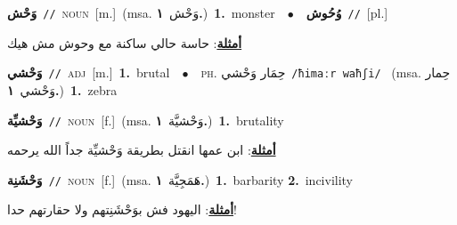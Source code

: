 \documentclass[10pt,a4paper,twoside]{article} %
\begin{document}
\begin{multicols}{2}
{\setlength\topsep{0pt}\textbf{\foreignlanguage{arabic}{وَحْش}}\ {\color{gray}\texttt{//}\color{black}}\ \textsc{noun}\ [m.]\ \color{gray}(msa. \foreignlanguage{arabic}{وَحْش}~\foreignlanguage{arabic}{\textbf{١.}})\color{black}\ \textbf{1.}~monster\ \ $\bullet$\ \ \setlength\topsep{0pt}\textbf{\foreignlanguage{arabic}{وُحُوش}}\ {\color{gray}\texttt{//}\color{black}}\ [pl.]\  \begin{flushright}\color{gray}\foreignlanguage{arabic}{\textbf{\underline{\foreignlanguage{arabic}{أمثلة}}}: حاسة حالي ساكنة مع وحوش مش هيك}\end{flushright}\color{black}} \vspace{2mm}

{\setlength\topsep{0pt}\textbf{\foreignlanguage{arabic}{وَحْشي}}\ {\color{gray}\texttt{//}\color{black}}\ \textsc{adj}\ [m.]\ \textbf{1.}~brutal\ \ $\bullet$\ \ \textsc{ph.} \color{gray} \foreignlanguage{arabic}{حِمَار وَحْشي}\color{black}\ {\color{gray}\texttt{/{\sffamily ħimaːr waħʃi}/}\color{black}}\ \color{gray} (msa. \foreignlanguage{arabic}{حِمار وَحْشي}~\foreignlanguage{arabic}{\textbf{١.}})\color{black}\ \textbf{1.}~zebra\ } \vspace{2mm}

{\setlength\topsep{0pt}\textbf{\foreignlanguage{arabic}{وَحْشيِّة}}\ {\color{gray}\texttt{//}\color{black}}\ \textsc{noun}\ [f.]\ \color{gray}(msa. \foreignlanguage{arabic}{وَحْشيَّة}~\foreignlanguage{arabic}{\textbf{١.}})\color{black}\ \textbf{1.}~brutality\  \begin{flushright}\color{gray}\foreignlanguage{arabic}{\textbf{\underline{\foreignlanguage{arabic}{أمثلة}}}: ابن عمها انقتل بطريقة وَحْشيِّة جداً الله يرحمه}\end{flushright}\color{black}} \vspace{2mm}

{\setlength\topsep{0pt}\textbf{\foreignlanguage{arabic}{وَحْشَنِة}}\ {\color{gray}\texttt{//}\color{black}}\ \textsc{noun}\ [f.]\ \color{gray}(msa. \foreignlanguage{arabic}{هَمَجِيَّة}~\foreignlanguage{arabic}{\textbf{١.}})\color{black}\ \textbf{1.}~barbarity  \textbf{2.}~incivility\  \begin{flushright}\color{gray}\foreignlanguage{arabic}{\textbf{\underline{\foreignlanguage{arabic}{أمثلة}}}: اليهود فش بوَحْشَنِتهم ولا حقارتهم حدا!}\end{flushright}\color{black}} \vspace{2mm}


\end{multicols}
\end{document}
